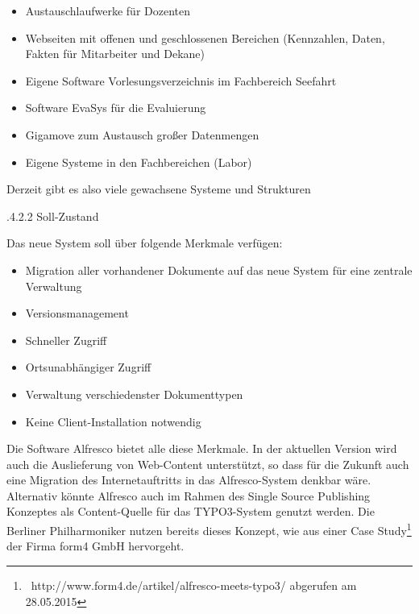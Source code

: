 \documentclass[a4paper]{article}
\newcommand\liststyleWWviiiNumviii{%
\renewcommand\labelitemi{{\textbullet}}
\renewcommand\labelitemii{o}
\renewcommand\labelitemiii{${\blacksquare}$}
\renewcommand\labelitemiv{{\textbullet}}
}
\newcommand\liststyleWWviiiNumvii{%
\renewcommand\labelitemi{{\textbullet}}
\renewcommand\labelitemii{o}
\renewcommand\labelitemiii{${\blacksquare}$}
\renewcommand\labelitemiv{{\textbullet}}
}
\begin{document}
\bigskip

\liststyleWWviiiNumviii
\begin{itemize}
\item {\sffamily
Austauschlaufwerke für Dozenten}
\item {\sffamily
Webseiten mit offenen und geschlossenen Bereichen (Kennzahlen, Daten, Fakten für Mitarbeiter und Dekane)}
\item {\sffamily
Eigene Software Vorlesungsverzeichnis im Fachbereich Seefahrt}
\item {\sffamily
Software EvaSys für die Evaluierung}
\item {\sffamily
Gigamove zum Austausch großer Datenmengen}
\item {\sffamily
Eigene Systeme in den Fachbereichen (Labor)}
\end{itemize}

\bigskip

{\sffamily
Derzeit gibt es also viele gewachsene Systeme und Strukturen}


\bigskip

{.4.2.2 Soll-Zustand}


\bigskip

{\sffamily
Das neue System soll über folgende Merkmale verfügen:}


\bigskip

\liststyleWWviiiNumvii
\begin{itemize}
\item {\sffamily
Migration aller vorhandener Dokumente auf das neue System für eine zentrale Verwaltung}
\item {\sffamily
Versionsmanagement}
\item {\sffamily
Schneller Zugriff}
\item {\sffamily
Ortsunabhängiger Zugriff}
\item {\sffamily
Verwaltung verschiedenster Dokumenttypen}
\item {\sffamily
Keine Client-Installation notwendig}
\end{itemize}

\bigskip

{\sffamily
Die Software Alfresco bietet alle diese Merkmale. In der aktuellen Version wird auch die Auslieferung von Web-Content
unterstützt, so dass für die Zukunft auch eine Migration des Internetauftritts in das Alfresco-System denkbar wäre.
Alternativ könnte Alfresco auch im Rahmen des Single Source Publishing Konzeptes als Content-Quelle für das
TYPO3-System genutzt werden. Die Berliner Philharmoniker nutzen bereits dieses Konzept, wie aus einer Case
Study\footnote{\ http://www.form4.de/artikel/alfresco-meets-typo3/ abgerufen am 28.05.2015} der Firma form4 GmbH
hervorgeht. }
\end{document}
